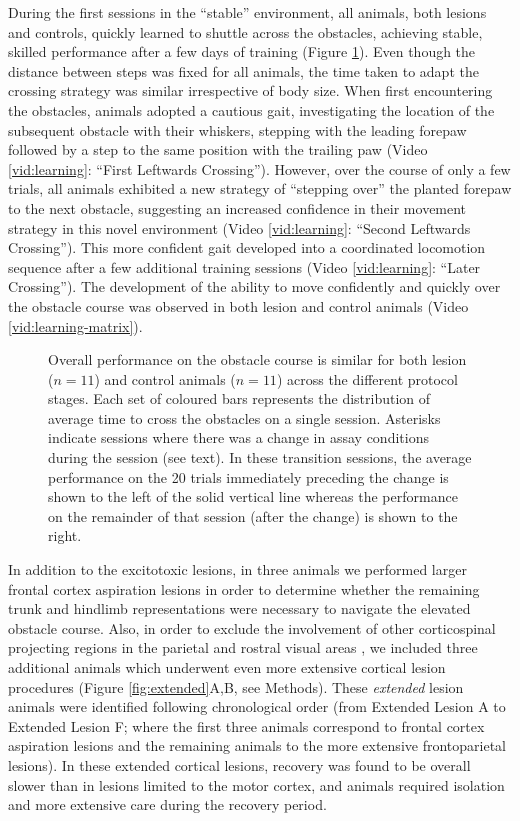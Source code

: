 During the first sessions in the ``stable'' environment, all animals, both lesions and controls, quickly learned to shuttle across the obstacles, achieving stable, skilled performance after a few days of training (Figure \ref{fig:learning}). Even though the distance between steps was fixed for all animals, the time taken to adapt the crossing strategy was similar irrespective of body size. When first encountering the obstacles, animals adopted a cautious gait, investigating the location of the subsequent obstacle with their whiskers, stepping with the leading forepaw followed by a step to the same position with the trailing paw (Video \ref{vid:learning}: ``First Leftwards Crossing''). However, over the course of only a few trials, all animals exhibited a new strategy of ``stepping over'' the planted forepaw to the next obstacle, suggesting an increased confidence in their movement strategy in this novel environment (Video \ref{vid:learning}: ``Second Leftwards Crossing''). This more confident gait developed into a coordinated locomotion sequence after a few additional training sessions (Video \ref{vid:learning}: ``Later Crossing''). The development of the ability to move confidently and quickly over the obstacle course was observed in both lesion and control animals (Video \ref{vid:learning-matrix}).

\begin{figure}
\centering

\caption{Overall performance on the obstacle course is similar for both lesion ($n = 11$) and control animals ($n = 11$) across the different protocol stages. Each set of coloured bars represents the distribution of average time to cross the obstacles on a single session. Asterisks indicate sessions where there was a change in assay conditions during the session (see text). In these transition sessions, the average performance on the 20 trials immediately preceding the change is shown to the left of the solid vertical line whereas the performance on the remainder of that session (after the change) is shown to the right.}
\label{fig:learning}
\end{figure}

In addition to the excitotoxic lesions, in three animals we performed larger frontal cortex aspiration lesions in order to determine whether the remaining trunk and hindlimb representations were necessary to navigate the elevated obstacle course. Also, in order to exclude the involvement of other corticospinal projecting regions in the parietal and rostral visual areas \cite{Miller1987}, we included three additional animals which underwent even more extensive cortical lesion procedures (Figure \ref{fig:extended}A,B, see Methods). These \emph{extended} lesion animals were identified following chronological order (from Extended Lesion A to Extended Lesion F; where the first three animals correspond to frontal cortex aspiration lesions and the remaining animals to the more extensive frontoparietal lesions). In these extended cortical lesions, recovery was found to be overall slower than in lesions limited to the motor cortex, and animals required isolation and more extensive care during the recovery period.

